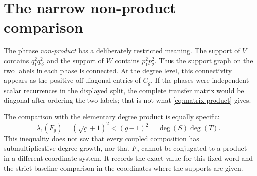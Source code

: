 \documentclass[11pt]{article}
\theoremstyle{remark}
\numberwithin{equation}{section}
\begin{document}
\section{The narrow non-product comparison}\label{sec:comparison}

The phrase \emph{non-product} has a deliberately restricted meaning.  The
support of \(V\) contains \(q_1^2q_2^2\), and the support of \(W\) contains
\(p_1^2p_2^2\).  Thus the support graph on the two labels in each phase is
connected.  At the degree level, this connectivity appears as the positive
off-diagonal entries of \(C_g\).  If the phases were independent scalar
recurrences in the displayed split, the complete transfer matrix would be
diagonal after ordering the two labels; that is not what
\eqref{eq:matrix-product} gives.

The comparison with the elementary degree product is equally specific:
\[
 \lambda_1(F_g)=(\sqrt g+1)^2
 <(g-1)^2=\deg(S)\deg(T).
\]
This inequality does not say that every coupled composition has submultiplicative
degree growth, nor that \(F_g\) cannot be conjugated to a product in a different
coordinate system.  It records the exact value for this fixed word and the
strict baseline comparison in the coordinates where the supports are given.
\end{document}
